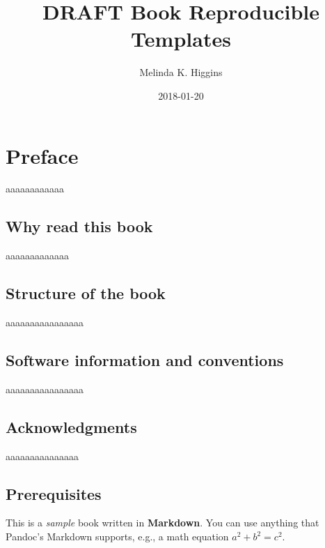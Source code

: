 \documentclass[]{book}
\title{DRAFT Book Reproducible Templates}
\author{Melinda K. Higgins}
\date{2018-01-20}
\theoremstyle{definition}
\theoremstyle{definition}
\theoremstyle{definition}
\theoremstyle{remark}
\begin{document}
\maketitle

{
\setcounter{tocdepth}{1}
\tableofcontents
}
\listoftables
\listoffigures
\chapter*{Preface}\label{preface}

aaaaaaaaaaaa

\section*{Why read this book}\label{why-read-this-book}

aaaaaaaaaaaaa

\section*{Structure of the book}\label{structure-of-the-book}

aaaaaaaaaaaaaaaa

\section*{Software information and
conventions}\label{software-information-and-conventions}

aaaaaaaaaaaaaaaa

\section*{Acknowledgments}\label{acknowledgments}

aaaaaaaaaaaaaaa

\section*{Prerequisites}\label{prerequisites}

This is a \emph{sample} book written in \textbf{Markdown}. You can use
anything that Pandoc's Markdown supports, e.g., a math equation
\(a^2 + b^2 = c^2\).
\end{document}
